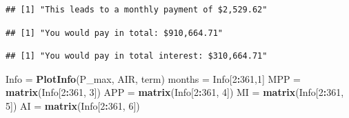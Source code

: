 \documentclass[12pt]{article}
\newenvironment{Section}[1]{}{\newpage}
\newenvironment{Shaded}{\begin{snugshade}}{\end{snugshade}}
\newcommand{\DecValTok}[1]{\textcolor[rgb]{0.00,0.00,0.81}{#1}}
\newcommand{\KeywordTok}[1]{\textcolor[rgb]{0.13,0.29,0.53}{\textbf{#1}}}
\newcommand{\NormalTok}[1]{#1}
\newcommand{\OperatorTok}[1]{\textcolor[rgb]{0.81,0.36,0.00}{\textbf{#1}}}
\newcommand{\StringTok}[1]{\textcolor[rgb]{0.31,0.60,0.02}{#1}}
\begin{document}
\begin{Section}{Example A}
\begin{singlespace}
\begin{Shaded}
\end{Shaded}

\begin{verbatim}
## [1] "This leads to a monthly payment of $2,529.62"
\end{verbatim}

\begin{Shaded}
\end{Shaded}

\begin{verbatim}
## [1] "You would pay in total: $910,664.71"
\end{verbatim}

\begin{Shaded}
\end{Shaded}

\begin{verbatim}
## [1] "You would pay in total interest: $310,664.71"
\end{verbatim}
\newpage
\begin{Shaded}
\begin{Highlighting}[]
\NormalTok{Info =}\StringTok{ }\KeywordTok{PlotInfo}\NormalTok{(P_max, AIR, term)}
\NormalTok{months =}\StringTok{ }\NormalTok{Info[}\DecValTok{2}\OperatorTok{:}\DecValTok{361}\NormalTok{,}\DecValTok{1}\NormalTok{]}
\NormalTok{MPP =}\StringTok{ }\KeywordTok{matrix}\NormalTok{(Info[}\DecValTok{2}\OperatorTok{:}\DecValTok{361}\NormalTok{, }\DecValTok{3}\NormalTok{])}
\NormalTok{APP =}\StringTok{ }\KeywordTok{matrix}\NormalTok{(Info[}\DecValTok{2}\OperatorTok{:}\DecValTok{361}\NormalTok{, }\DecValTok{4}\NormalTok{])}
\NormalTok{MI =}\StringTok{ }\KeywordTok{matrix}\NormalTok{(Info[}\DecValTok{2}\OperatorTok{:}\DecValTok{361}\NormalTok{, }\DecValTok{5}\NormalTok{])}
\NormalTok{AI =}\StringTok{ }\KeywordTok{matrix}\NormalTok{(Info[}\DecValTok{2}\OperatorTok{:}\DecValTok{361}\NormalTok{, }\DecValTok{6}\NormalTok{])}


\end{Highlighting}
\end{Shaded}
\end{singlespace}
\end{Section}
\end{document}
